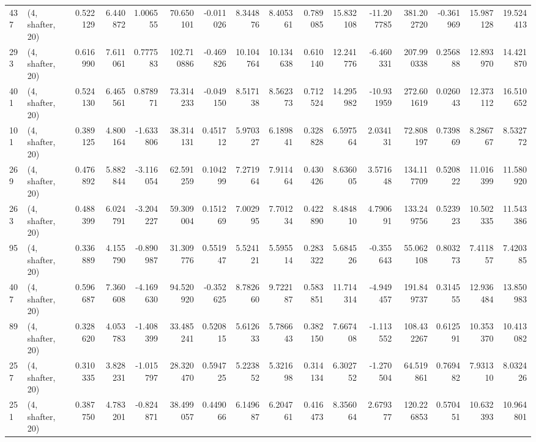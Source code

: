 \begin{tabular}{llrrrrrrrrrrrrrr}
437 &  (4, shafter, 20) &   0.522129 &   6.440872 &   1.006555 &    70.650101 &  -0.011026 &   8.344876 &   8.405361 &  0.789085 &  15.832108 & -11.207785 &   381.202720 & -0.361969 &  15.987128 &  19.524413 \\
293 &  (4, shafter, 20) &   0.616990 &   7.611061 &   0.777583 &   102.710886 &  -0.469826 &  10.104764 &  10.134638 &  0.610140 &  12.241776 &  -6.460331 &   207.990338 &  0.256888 &  12.893970 &  14.421870 \\
401 &  (4, shafter, 20) &   0.524130 &   6.465561 &   0.878971 &    73.314233 &  -0.049150 &   8.517138 &   8.562373 &  0.712524 &  14.295982 & -10.931959 &   272.601619 &  0.026043 &  12.373112 &  16.510652 \\
101 &  (4, shafter, 20) &   0.389125 &   4.800164 &  -1.633806 &    38.314131 &   0.451712 &   5.970327 &   6.189841 &  0.328828 &   6.597564 &   2.034131 &    72.808197 &  0.739869 &   8.286767 &   8.532772 \\
269 &  (4, shafter, 20) &   0.476892 &   5.882844 &  -3.116054 &    62.591259 &   0.104299 &   7.271964 &   7.911464 &  0.430426 &   8.636005 &   3.571648 &   134.117709 &  0.520822 &  11.016399 &  11.580920 \\
263 &  (4, shafter, 20) &   0.488399 &   6.024791 &  -3.204227 &    59.309004 &   0.151269 &   7.002995 &   7.701234 &  0.422890 &   8.484810 &   4.790691 &   133.249756 &  0.523923 &  10.502335 &  11.543386 \\
95  &  (4, shafter, 20) &   0.336889 &   4.155790 &  -0.890987 &    31.309776 &   0.551947 &   5.524121 &   5.595514 &  0.283322 &   5.684526 &  -0.355643 &    55.062108 &  0.803273 &   7.411857 &   7.420385 \\
407 &  (4, shafter, 20) &   0.596687 &   7.360608 &  -4.169630 &    94.520920 &  -0.352625 &   8.782660 &   9.722187 &  0.583851 &  11.714314 &  -4.949457 &   191.849737 &  0.314555 &  12.936484 &  13.850983 \\
89  &  (4, shafter, 20) &   0.328620 &   4.053783 &  -1.408399 &    33.485241 &   0.520815 &   5.612633 &   5.786643 &  0.382150 &   7.667408 &  -1.113552 &   108.432267 &  0.612591 &  10.353370 &  10.413082 \\
257 &  (4, shafter, 20) &   0.310335 &   3.828231 &  -1.015797 &    28.320470 &   0.594725 &   5.223852 &   5.321698 &  0.314134 &   6.302752 &  -1.270504 &    64.519861 &  0.769482 &   7.931310 &   8.032426 \\
251 &  (4, shafter, 20) &   0.387750 &   4.783201 &  -0.824871 &    38.499057 &   0.449066 &   6.149687 &   6.204761 &  0.416473 &   8.356064 &   2.679377 &   120.226853 &  0.570451 &  10.632393 &  10.964801 \\

\end{tabular}

